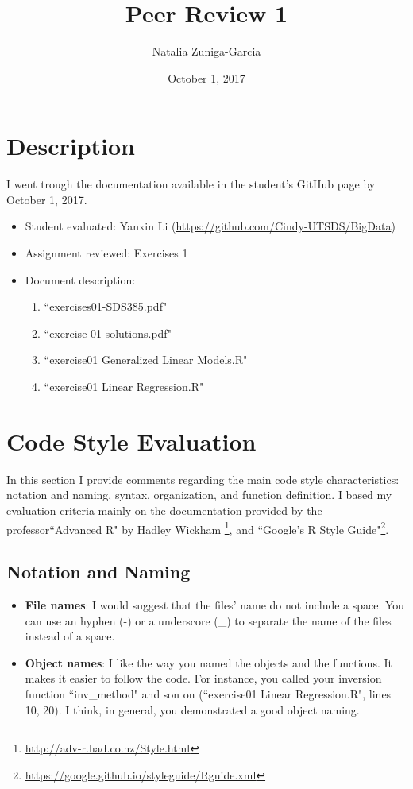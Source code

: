\documentclass[11 pt]{article}
\author{Natalia Zuniga-Garcia}
\title{Peer Review 1}
\date{October 1, 2017}
\begin{document}
\maketitle

\section{Description}

I went trough the documentation available in the student's GitHub page by October 1, 2017.

\begin{itemize}
	\item Student evaluated:  Yanxin Li (\url{https://github.com/Cindy-UTSDS/BigData})
	\item Assignment reviewed: Exercises 1
	\item Document description:
	\begin{enumerate}[label=\arabic*.]
		\item ``exercises01-SDS385.pdf"
		\item ``exercise 01 solutions.pdf"
		\item ``exercise01 Generalized Linear Models.R"
		\item ``exercise01 Linear Regression.R"
	\end{enumerate}

\end{itemize}
	
\section{Code Style Evaluation}
In this section I provide comments regarding the main code style characteristics: notation and naming, syntax, organization, and function definition. I based my evaluation criteria mainly on the documentation provided by the professor``Advanced R" by Hadley Wickham \footnote{\url{http://adv-r.had.co.nz/Style.html}}, and ``Google's R Style Guide"\footnote{\url{https://google.github.io/styleguide/Rguide.xml}}. 

\subsection{Notation and Naming}
\begin{itemize}
	\item \textbf{File names}: I would suggest that the files' name do not include a space. You can use an hyphen (-) or a underscore (\_) to separate the name of the files instead of a space.
	\item \textbf{Object names}: I like the way you named the objects and the functions. It makes it easier to follow the code.  For instance, you called your inversion function ``inv\_method" and son on (``exercise01 Linear Regression.R", lines 10, 20). I think, in general, you demonstrated a good object naming.
\end{itemize}
\end{document}
